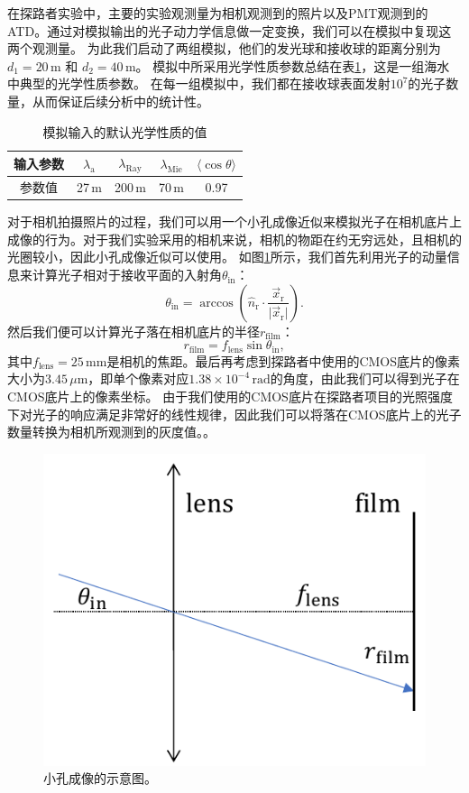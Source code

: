 在探路者实验中，主要的实验观测量为相机观测到的照片以及PMT观测到的ATD。通过对模拟输出的光子动力学信息做一定变换，我们可以在模拟中复现这两个观测量。
为此我们启动了两组模拟，他们的发光球和接收球的距离分别为$d_1 = 20\, \mathrm{m}$ 和 $d_2 = 40\, \mathrm{m}$。
模拟中所采用光学性质参数总结在表\ref{tab:pathfinder_sim_set}，这是一组海水中典型的光学性质参数\cite{OP_ANTARES:2004, OP_P-One:2021, TRIDENT_pathfinder:2022}。
在每一组模拟中，我们都在接收球表面发射$10^7$的光子数量，从而保证后续分析中的统计性。

\begin{table}
    \centering
    \caption{模拟输入的默认光学性质的值}
    \label{tab:pathfinder_sim_set}
    \centering
    \begin{tabular}{|c|c|c|c|c|}
        \hline
        输入参数 & $\lambda_\mathrm{a}$ & $\lambda_\mathrm{Ray}$ & $\lambda_\mathrm{Mie}$ & $\langle \cos\theta \rangle$\\
        \hline
        参数值 & 27\,m & 200\,m & 70\,m & 0.97\\
        \hline
    \end{tabular}
\end{table}

对于相机拍摄照片的过程，我们可以用一个小孔成像近似来模拟光子在相机底片上成像的行为。对于我们实验采用的相机来说，相机的物距在约无穷远处，且相机的光圈较小，因此小孔成像近似可以使用。
如图\ref{fig:pathfinder_sim_cam_pinhole}所示，我们首先利用光子的动量信息来计算光子相对于接收平面的入射角$\theta_\mathrm{in}$：
\begin{equation}
    \theta_\mathrm{in} = \arccos \left( \hat{n}_\mathrm{r} \cdot \frac{\vec{x}_\mathrm{r}}{\vert\vec{x}_\mathrm{r}\vert} \right) . \label{eq:pathfinder_sim_cam_pinhole}
\end{equation}
然后我们便可以计算光子落在相机底片的半径$r_\mathrm{film}$：
\begin{equation}
    r_\mathrm{film} = f_\mathrm{lens} \sin{\theta_\mathrm{in}} , \label{eq:camera_radius}
\end{equation}
其中$f_\mathrm{lens} = 25\,\mathrm{mm}$是相机的焦距。最后再考虑到探路者中使用的CMOS底片的像素大小为$3.45\,\mu\mathrm{m}$，即单个像素对应$1.38 \times 10^{-4} \,\mathrm{rad}$的角度，由此我们可以得到光子在CMOS底片上的像素坐标。
由于我们使用的CMOS底片在探路者项目的光照强度下对光子的响应满足非常好的线性规律，因此我们可以将落在CMOS底片上的光子数量转换为相机所观测到的灰度值。\cite{pathfinder_camera:2022}。

\begin{figure}[htb]
    \centering
    \includegraphics[width=0.5\linewidth]{img/pathfinder_sim_cam_pinhole.pdf}
    \caption{小孔成像的示意图。}
    \label{fig:pathfinder_sim_cam_pinhole}
\end{figure}

